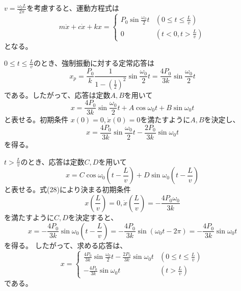 \documentclass[a4paper]{jsarticle}
\begin{document}
\subsection{}
$v = \frac{\omega_0 L}{2 \pi}$を考慮すると、運動方程式は
\begin{equation}
  m \ddot{x} + c \dot{x} + kx =
  \begin{cases}
    P_0 \sin \frac{\omega_0}{2} t & (0 \leq t \leq \frac{L}{v}) \\
    0 & (t < 0, t > \frac{L}{v})
  \end{cases}
\end{equation}
となる。\par
$0 \leq t \leq \frac{L}{v}$のとき、強制振動に対する定常応答は
\begin{equation}
  x_p = \frac{P_0}{k} \frac{1}{1 - \left(\frac{1}{2}\right)^2} \sin \frac{\omega_0}{2} t
  = \frac{4 P_0}{3k} \sin \frac{\omega_0}{2} t
\end{equation}
である。したがって、応答は定数$A,B$を用いて
\begin{equation}
  x = \frac{4 P_0}{3k} \sin \frac{\omega_0}{2} t + A \cos \omega_0 t + B \sin \omega_0 t
\end{equation}
と表せる。初期条件
$x(0) = 0, \dot{x}(0) = 0$を満たすように$A,B$を決定し、
\begin{equation}
  x = \frac{4 P_0}{3k} \sin \frac{\omega_0}{2} t
  - \frac{2 P_0}{3k} \sin \omega_0 t
\end{equation}
を得る。\par
$t > \frac{L}{v}$のとき、応答は定数$C,D$を用いて
\begin{equation}
  x = C \cos \omega_0 \left(t - \frac{L}{v}\right)
  + D \sin \omega_0 \left(t - \frac{L}{v}\right)
\end{equation}
と表せる。式(28)により決まる初期条件
\begin{equation}
  x\left(\frac{L}{v}\right) = 0, \dot{x}\left(\frac{L}{v}\right) = -\frac{4 P_0 \omega_0}{3k}
\end{equation}
を満たすように$C, D$を決定すると、
\begin{equation}
  x = -\frac{4 P_0}{3 k} \sin \omega_0 \left(t - \frac{L}{v}\right)
  = -\frac{4 P_0}{3 k} \sin (\omega_0 t - 2 \pi)
  = -\frac{4 P_0}{3 k} \sin \omega_0 t
\end{equation}
を得る。
したがって、求める応答は、
\begin{equation}
  x =
  \begin{cases}
    \frac{4 P_0}{3k} \sin \frac{\omega_0}{2} t
    - \frac{2 P_0}{3k} \sin \omega_0 t &
    \left(0 \leq t \leq \frac{L}{v}\right) \\
    -\frac{4 P_0}{3 k} \sin \omega_0 t &
    \left(t > \frac{L}{v}\right)
  \end{cases}
\end{equation}
である。
\end{document}

